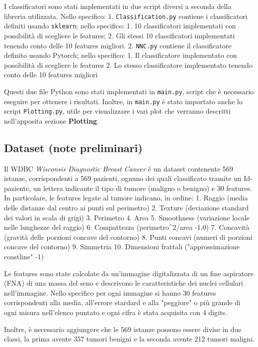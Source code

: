 \documentclass[11pt]{article}
\begin{document}
    I classificatori sono stati implementati in due script diversi a seconda
della libreria utilizzata. Nello specifico: 1.
\texttt{Classification.py} contiene i classificatori definiti usando
\texttt{sklearn}; nello specifico: 1. 10 classificatori implementati con
possibilità di scegliere le features; 2. Gli stessi 10 classificatori
implementati tenendo conto delle 10 features migliori. 2.
\texttt{NNC.py} contiene il classificatore definito usando Pytorch;
nello specifico: 1. Il classificatore implementato con possibilità di
scegliere le features 2. Lo stesso classificatore implementato tenendo
conto delle 10 features migliori

Questi due file Python sono stati implementati in \texttt{main.py},
script che è necessario eseguire per ottenere i risultati. Inoltre, in
\texttt{main.py} è stato importato anche lo script \texttt{Plotting.py},
utile per visualizzare i vari plot che verranno descritti nell'apposita
sezione \textbf{Plotting}.

    \subsection{Dataset (note preliminari)}\label{dataset-note-preliminari}

    Il WDBC \emph{Wisconsis Diagnostic Breast Cancer} è un dataset
contenente 569 istanze, corrispondenti a 569 pazienti, ognuno dei quali
classificato tramite un Id-paziente, un lettera indicante il tipo di
tumore (maligno o benigno) e 30 features. In particolare, le features
legate al tumore indicano, in ordine: 1. Raggio (media delle distanze
dal centro ai punti sul perimetro) 2. Texture (deviazione standard dei
valori in scala di grigi) 3. Perimetro 4. Area 5. Smoothness (variazione
locale nelle lunghezze del raggio) 6. Compattezza (perimetro\^{}2/area
-1.0) 7. Concavità (gravità delle porzioni concave del contorno) 8.
Punti concavi (numeri di porzioni concave del contorno) 9. Simmetria 10.
Dimensioni frattali ("approssimazione coastline" -1)

Le features sono state calcolate da un'immagine digitalizzata di un fine
aspiratore (FNA) di una massa del seno e descrivono le caratteristiche
dei nuclei cellulari nell'immagine. Nello specifico per ogni immagine si
hanno 30 features corrispondenti alla media, all'errore stardard e alla
"peggiore" o più grande di ogni misura nell'elenco puntato e ogni cifra
è stata acquisita con 4 digits.

Inoltre, è necessario aggiungere che le 569 istanze possono essere
divise in due classi, la prima avente 357 tumori benigni e la seconda
avente 212 tumori maligni.
\end{document}
